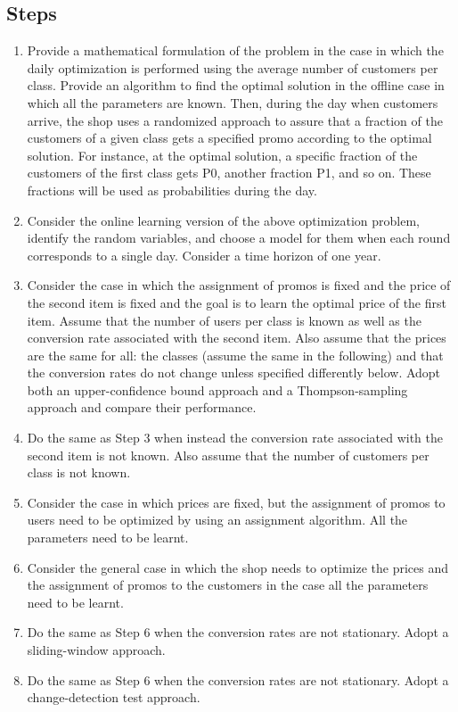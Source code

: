\subsection{Steps}
\begin{enumerate}
\item Provide a mathematical formulation of the problem in the case in which the daily optimization is performed using the average number of customers per class. Provide an algorithm to find the optimal solution in the offline case in which all the parameters are known. Then, during the day when customers arrive, the shop uses a randomized approach to assure that a fraction of the customers of a given class gets a specified promo according to the optimal solution. For instance, at the optimal solution, a specific fraction of the customers of the first class gets P0, another fraction P1, and so on. These fractions will be used as probabilities during the day.
\item Consider the online learning version of the above optimization problem, identify the random variables, and choose a model for them when each round corresponds to a single day. Consider a time horizon of one year.
\item Consider the case in which the assignment of promos is fixed and the price of the second item is fixed and the goal is to learn the optimal price of the first item. Assume that the number of users per class is known as well as the conversion rate associated with the second item. Also assume that the prices are the same for all: the classes (assume the same in the following) and that the conversion rates do not change unless specified differently below. Adopt both an upper-confidence bound approach and a Thompson-sampling approach and compare their performance.
\item Do the same as Step 3 when instead the conversion rate associated with the second item is not known. Also assume that the number of customers per class is not known.
\item Consider the case in which prices are fixed, but the assignment of promos to users need to be optimized by using an assignment algorithm. All the parameters need to be learnt. 
\item Consider the general case in which the shop needs to optimize the prices and the assignment of promos to the customers in the case all the parameters need to be learnt.
\item Do the same as Step 6 when the conversion rates are not stationary. Adopt a sliding-window approach.
\item Do the same as Step 6 when the conversion rates are not stationary. Adopt a change-detection test approach.
\end{enumerate}
